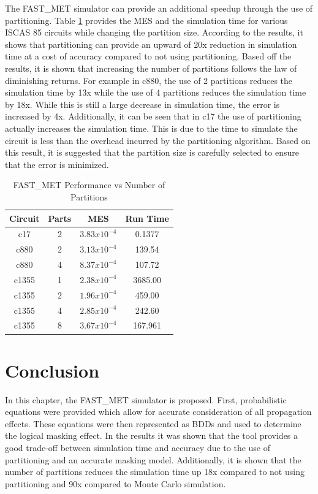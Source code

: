 The FAST\_MET simulator can provide an additional speedup through the use of partitioning. Table \ref{table:restable} provides the MES and the simulation time for various ISCAS 85 circuits while changing the partition size. According to the results, it shows that partitioning can provide an upward of 20x reduction in simulation time at a cost of accuracy compared to not using partitioning. Based off the results, it is shown that increasing the number of partitions follows the law of diminishing returns. For example in c880, the use of 2 partitions reduces the simulation time by 13x while the use of 4 partitions reduces the simulation time by 18x. While this is still a large decrease in simulation time, the error is increased by 4x. Additionally, it can be seen that in c17 the use of partitioning actually increases the simulation time. This is due to the time to simulate the circuit is less than the overhead incurred by the partitioning algorithm. Based on this result, it is suggested that the partition size is carefully selected to ensure that the error is minimized.

\begin{table}[ht]
	\begin{center}
		\caption{FAST\_MET Performance vs Number of Partitions}
		\label{table:restable}
		\begin{tabular}{|c|c|c|c|}
			\hline
			Circuit& Parts & MES & Run Time\\ 
			\hline
			c17 & 2 & $3.83x10^{-4}$ & 0.1377\\
			\hline
			c880 & 2 & $3.13x10^{-4}$ & 139.54\\
			\hline
			c880 & 4 & $8.37x10^{-4}$ & 107.72\\
			\hline
			c1355 & 1 & $2.38x10^{-4}$ & 3685.00\\
			\hline
			c1355 & 2 & $1.96x10^{-4}$ & 459.00\\
			\hline
			c1355 & 4 & $2.85x10^{-4}$ & 242.60\\
			\hline
			c1355 & 8 & $3.67x10^{-4}$ & 167.961\\
			\hline
		\end{tabular}
	\end{center}
\end{table}

\section{Conclusion}
In this chapter, the FAST\_MET simulator is proposed. First, probabilistic equations were provided which allow for accurate consideration of all propagation effects. These equations were then represented as BDDs and used to determine the logical masking effect. In the results it was shown that the tool provides a good trade-off between simulation time and accuracy due to the use of partitioning and an accurate masking model. Additionally, it is shown that the number of partitions reduces the simulation time up 18x compared to not using partitioning and 90x compared to Monte Carlo simulation.

